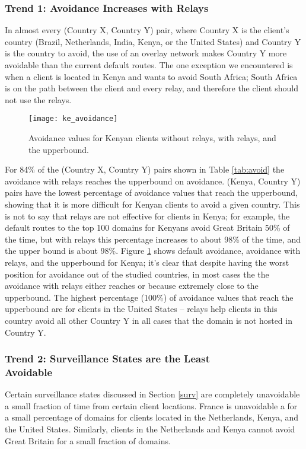 \subsubsection{Trend 1: Avoidance Increases with Relays}
In almost every (Country X, Country Y) pair, where Country X is the client's country (Brazil, Netherlands, India, Kenya, or the United States) and Country Y is the country to avoid, the use of an overlay network makes Country Y more avoidable than the current default routes.  The one exception we encountered is when a client is located in Kenya and wants to avoid South Africa; South Africa is on the path between the client and every relay, and therefore the client should not use the relays.  

\begin{figure}
\centering
\texttt{[image: ke\_avoidance]}
\caption{Avoidance values for Kenyan clients without relays, with relays, and the upperbound.}
\label{fig:ke_avoidance}
\end{figure}

For 84\% of the (Country X, Country Y) pairs shown in Table \ref{tab:avoid} the avoidance with relays reaches the upperbound on avoidance.  (Kenya, Country Y) pairs have the lowest percentage of avoidance values that reach the upperbound, showing that it is more difficult for Kenyan clients to avoid a given country.  This is not to say that relays are not effective for clients in Kenya; for example, the default routes to the top 100 domains for Kenyans avoid Great Britain 50\% of the time, but with relays this percentage increases to about 98\% of the time, and the upper bound is about 98\%. Figure \ref{fig:ke_avoidance} shows default avoidance, avoidance with relays, and the upperbound for Kenya; it's clear that despite having the worst position for avoidance out of the studied countries, in most cases the the avoidance with relays either reaches or because extremely close to the upperbound.  The highest percentage (100\%) of avoidance values that reach the upperbound are for clients in the United States -- relays help clients in this country avoid all other Country Y in all cases that the domain is not hosted in Country Y.  

\subsubsection{Trend 2: Surveillance States are the Least \\Avoidable}
Certain surveillance states discussed in Section \ref{surv} are completely unavoidable a small fraction of time from certain client locations.  France is unavoidable a for a small percentage of domains for clients located in the Netherlands, Kenya, and the United States.  Similarly, clients in the Netherlands and Kenya cannot avoid Great Britain for a small fraction of domains.  

